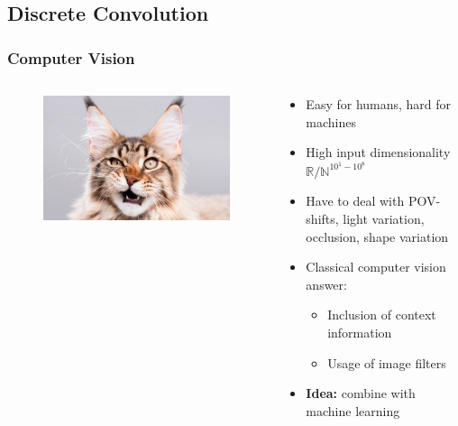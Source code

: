 \documentclass[aspectratio=169]{beamer}
\newcommand\imageright[1]{ %
    \caption*{\scalebox{.5}{\textcolor{lightgray}{\textcopyright~#1}}} %
}
\begin{document}
\subsection{Discrete Convolution}
\label{subsec:discrete-convolution}

\begin{frame}
\frametitle{Computer Vision}

\begin{columns}
    \begin{column}{0.48\textwidth}
        \begin{figure}
            \centering
            \includegraphics[width=\linewidth]{cat.jpg}
            \imageright{Catster}
        \end{figure}
    \end{column}
    \begin{column}{0.48\textwidth}
        \begin{itemize}
            \item Easy for humans, hard for machines
            \item High input dimensionality $\mathbb{R}/\mathbb{N}^{10^1-10^8}$
            \item Have to deal with POV-shifts, light variation, occlusion, shape variation
            \item Classical computer vision answer:
            \begin{itemize}
                \item Inclusion of context information
                \item Usage of image filters
            \end{itemize}
            \item \textbf{Idea:} combine with machine learning
        \end{itemize}
    \end{column}
\end{columns}
\end{frame}
\end{document}
